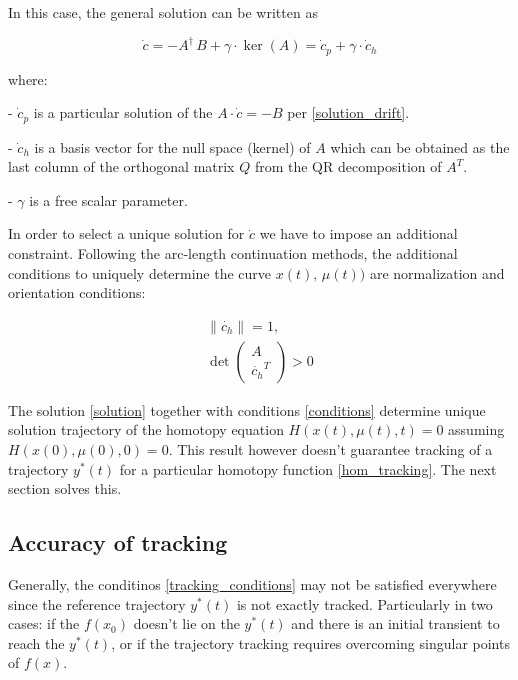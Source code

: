 \documentclass[11pt,american]{article}
\theoremstyle{definition}
\theoremstyle{plain}
\theoremstyle{remark}
\begin{document}
In this case, the general solution can be written as 

\begin{equation}\label{solution}
\dot c = -A^\dagger\,B + \gamma \cdot \ker(A) = \dot c_p + \gamma \cdot \dot c_h
\end{equation}

where:

- $\dot c_p$ is a particular solution of the $A \cdot \dot c = -B$ per \eqref{solution_drift}.

- $\dot c_h$ is a basis vector for the null space (kernel) of $A$ which can be obtained as the last column of the orthogonal matrix $Q$ from the QR decomposition of $A^T$.

- $\gamma$ is a free scalar parameter.

In order to select a unique solution for $\dot c$ we have to impose an additional constraint. Following the arc‐length continuation methods, the additional conditions to uniquely determine the curve $x(t),\,\mu(t))$ are normalization and orientation conditions:

\begin{equation}\label{conditions}
\begin{gathered}
\| \dot{c_h} \| = 1, \\
\det \begin{pmatrix} A \\ \dot{c_h}^T \end{pmatrix} > 0
\end{gathered}
\end{equation}

The solution \eqref{solution} together with conditions \eqref{conditions} determine unique solution trajectory of the homotopy equation $H(x(t),\mu(t),t)=0$ assuming $H(x(0),\mu(0),0)=0$. This result however doesn't guarantee tracking of a trajectory $y^*(t)$ for a particular homotopy function \eqref{hom_tracking}. The next section solves this.

\subsection{Accuracy of tracking}\label{sec:accuracy}
 
Generally, the conditinos \eqref{tracking_conditions} may not be satisfied everywhere since the reference trajectory $y^*(t)$ is not exactly tracked. Particularly in two cases: if the $f(x_0)$ doesn't lie on the $y^*(t)$ and there is an initial transient to reach the $y^*(t)$, or if the trajectory tracking requires overcoming singular points of $f(x)$.
\end{document}
